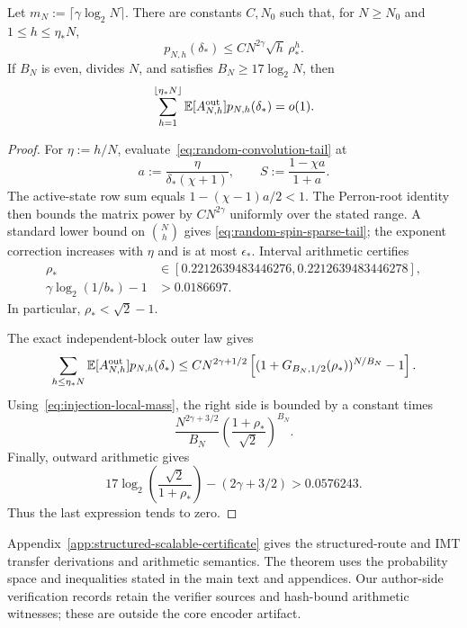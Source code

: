 \begin{lemma}
\label{lem:random-spin-sparse-closure}
Let $m_N:=\lceil\gamma\log_2N\rceil$. There are constants $C,N_0$ such
that, for $N\ge N_0$ and $1\le h\le\eta_*N$,
\begin{equation}
  p_{N,h}(\delta_*)
  \le C N^{2\gamma}\sqrt h\,\rho_*^h.
  \label{eq:random-spin-sparse-tail}
\end{equation}
If $B_N$ is even, divides $N$, and satisfies
$B_N\ge17\log_2N$, then
\begin{equation}
  \sum_{h=1}^{\lfloor\eta_*N\rfloor}
  \mathbb E[A_{N,h}^{\mathrm{out}}]p_{N,h}(\delta_*)
  =o(1).
  \label{eq:random-spin-sparse-sum}
\end{equation}
\end{lemma}

\begin{proof}
For $\eta:=h/N$, evaluate~\eqref{eq:random-convolution-tail} at
\[
  a:=\frac{\eta}{\delta_*(\chi+1)},
  \qquad
  S:=\frac{1-\chi a}{1+a}.
\]
The active-state row sum equals $1-(\chi-1)a/2<1$. The Perron-root identity
then bounds the matrix power by $CN^{2\gamma}$ uniformly over the stated
range. A standard lower bound on $\binom Nh$ gives
\eqref{eq:random-spin-sparse-tail}; the exponent correction increases with
$\eta$ and is at most $\epsilon_*$. Interval arithmetic certifies
\begin{align*}
  \rho_*&\in
  [0.2212639483446276,0.2212639483446278],\\
  \gamma\log_2(1/b_*)-1&>0.0186697.
\end{align*}
In particular, $\rho_*<\sqrt2-1$.

The exact independent-block outer law gives
\[
  \sum_{h\le\eta_*N}
  \mathbb E[A_{N,h}^{\mathrm{out}}]p_{N,h}(\delta_*)
  \le
  C N^{2\gamma+1/2}
  \left[(1+G_{B_N,1/2}(\rho_*))^{N/B_N}-1\right].
\]
Using~\eqref{eq:injection-local-mass}, the right side is bounded by a
constant times
\[
  \frac{N^{2\gamma+3/2}}{B_N}
  \left(\frac{1+\rho_*}{\sqrt2}\right)^{B_N}.
\]
Finally, outward arithmetic gives
\[
  17\log_2\!\left(\frac{\sqrt2}{1+\rho_*}\right)
  -(2\gamma+3/2)>0.0576243.
\]
Thus the last expression tends to zero.
\end{proof}

Appendix~\ref{app:structured-scalable-certificate} gives the structured-route
and IMT transfer derivations and arithmetic semantics.
The theorem uses the probability space and inequalities stated in the main
text and appendices. Our author-side verification records retain the verifier
sources and hash-bound arithmetic witnesses; these are outside the core
encoder artifact.

